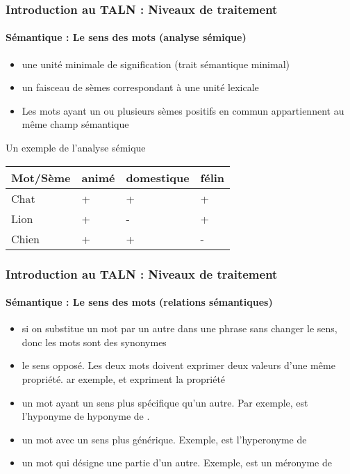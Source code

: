 \documentclass[xcolor=table]{beamer}
\begin{document}
\begin{frame}
\frametitle{Introduction au TALN : Niveaux de traitement}
\framesubtitle{Sémantique : Le sens des mots (analyse sémique)}

\begin{itemize}
	\item {} une unité minimale de signification (trait sémantique minimal)
	\item {} un faisceau de sèmes correspondant à une unité lexicale
	\item Les mots ayant un ou plusieurs sèmes positifs en commun appartiennent au même champ sémantique
\end{itemize}

\begin{exampleblock}{Un exemple de l'analyse sémique}
	\centering
	\begin{tabular}{|l|l|l|l|}
		\hline
		Mot/Sème & animé & domestique & félin \\
		\hline
		Chat & + & + & + \\
		\hline
		Lion & + & - & + \\
		\hline
		Chien & + & + & - \\
		\hline
	\end{tabular}
\end{exampleblock}

\end{frame}

\begin{frame}
\frametitle{Introduction au TALN : Niveaux de traitement}
\framesubtitle{Sémantique : Le sens des mots (relations sémantiques)}

\begin{itemize}
	\item {} si on substitue un mot par un autre dans une phrase sans changer le sens, donc les mots sont des synonymes
	\item {} le sens opposé. Les deux mots doivent exprimer deux valeurs d'une même propriété. ar exemple,  et  expriment la propriété 
	\item {} un mot ayant un sens plus spécifique qu'un autre. Par exemple,  est l'hyponyme de  hyponyme de . 
	\item {} un mot avec un sens plus générique. Exemple,  est l'hyperonyme de 
	\item {} un mot qui désigne une partie d'un autre. Exemple,  est un méronyme de 
\end{itemize}

\end{frame}
\end{document}
